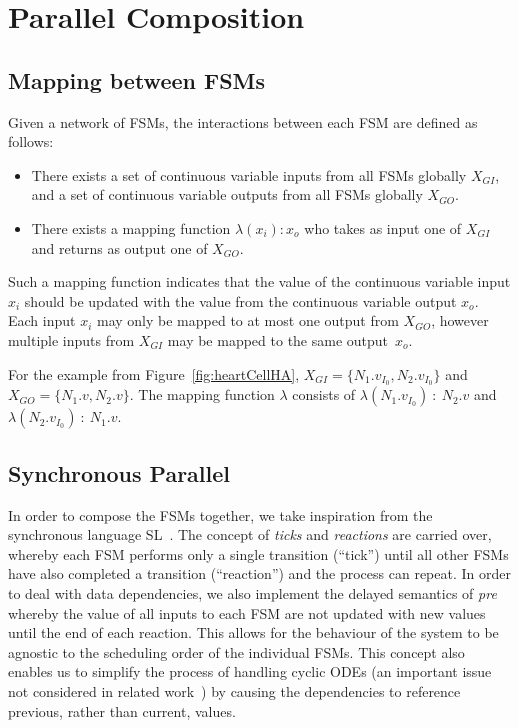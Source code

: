 \section{Parallel Composition}
\label{sec:composition}


\subsection{Mapping between \acp{FSM}}
\label{sec:mapping}

Given a network of \acp{FSM}, the interactions between each \ac{FSM} are 
defined as follows:
\begin{itemize}
	\item There exists a set of continuous variable inputs from all \acp{FSM} 
	globally $X_{GI}$, and a set of continuous variable outputs from all 
	\acp{FSM} globally $X_{GO}$.
	\item There exists a mapping function $\lambda(x_i) : x_o$ who takes as 
	input one of $X_{GI}$ and returns as output one of $X_{GO}$.
\end{itemize}

Such a mapping function indicates that the value of the continuous variable 
input $x_i$ should be updated with the value from the continuous variable 
output $x_o$.  Each input $x_i$ may only be mapped to at most one 
output from $X_{GO}$, however multiple inputs from $X_{GI}$ may be mapped to 
the same output~$x_o$.

For the example from Figure~\ref{fig:heartCellHA}, 
\mbox{$X_{GI} = \{N_{1}.v_{I_{0}},N_{2}.v_{I_{0}}\}$} and 
\mbox{$X_{GO} = \{N_{1}.v,N_{2}.v\}$}. 
The mapping function $\lambda$ consists of 
$\lambda(N_{1}.v_{I_{0}})~:~N_{2}.v$ and $\lambda(N_{2}.v_{I_{0}})~:~N_{1}.v$.

\subsection{Synchronous Parallel}
\label{sec:synchronousParallel}

%  

In order to compose the \acp{FSM} together, we take inspiration
from the synchronous language SL~\cite{SlLanguage}.  The 
concept of \emph{ticks} and \emph{reactions} are carried over, whereby each 
\ac{FSM} performs 
only a single transition (``tick'') until all other \acp{FSM} have also 
completed a transition (``reaction'') and the process can repeat.  In order to
deal with data dependencies, we also implement the delayed semantics of 
\emph{pre}
whereby the value of all inputs to each \ac{FSM} are not updated with
new values until the end of each reaction.  This allows for the behaviour of 
the system to be agnostic to the scheduling order of the individual 
\acp{FSM}.  This concept also enables us to simplify the process of 
handling cyclic \acp{ODE} (an important issue not considered in related 
work~\cite{kim2003modular}) by causing the dependencies to reference
previous, rather than current, values.

